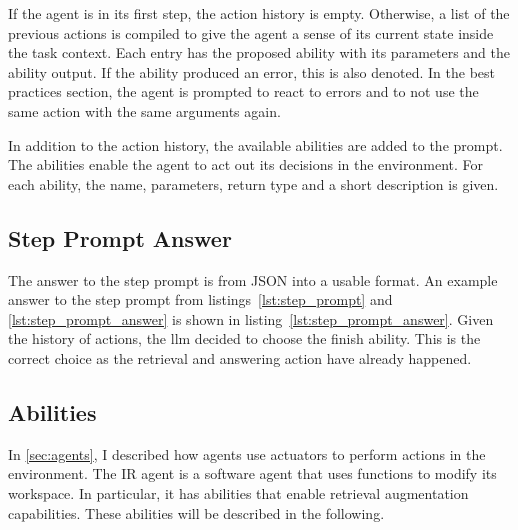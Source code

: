 \documentclass[../main.tex]{subfiles}
\begin{document}
If the agent is in its first step, the action history is empty.
Otherwise, a list of the previous actions is compiled to give the agent a sense of its current state inside the task context.
Each entry has the proposed ability with its parameters and the ability output.
If the ability produced an error, this is also denoted.
In the best practices section, the agent is prompted to react to errors and to not use the same action with the same arguments again.

In addition to the action history, the available abilities are added to the prompt.
The abilities enable the agent to act out its decisions in the environment.
For each ability, the name, parameters, return type and a short description is given.

\subsection{Step Prompt Answer}

The answer to the step prompt is from JSON into a usable format.
An example answer to the step prompt from listings~\ref{lst:step_prompt} and \ref{lst:step_prompt_answer}
is shown in listing~\ref{lst:step_prompt_answer}.
Given the history of actions, the \gls{llm} decided to choose the finish
ability.
This is the correct choice as the retrieval and answering action have
already happened.



\subsection{Abilities}

In \autoref{sec:agents}, I described how agents use actuators to perform actions in the environment.
The IR agent is a software agent that uses functions to modify its workspace.
In particular, it has abilities that enable retrieval augmentation capabilities.
These abilities will be described in the following.
\end{document}
